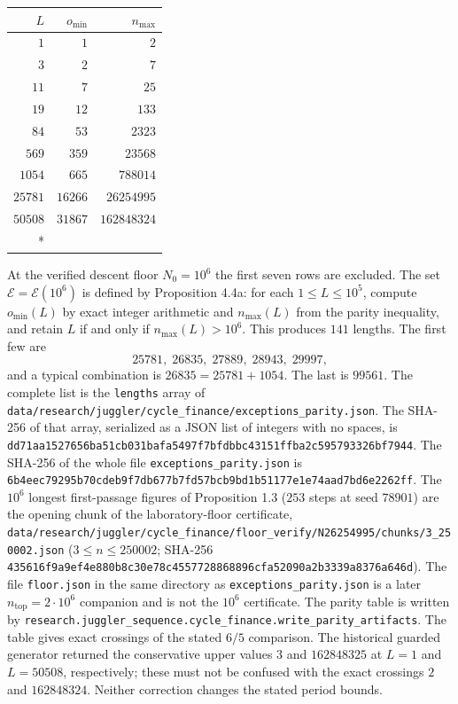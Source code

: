 \documentclass[12pt]{article}
\begin{document}
\begingroup\small

\begin{longtable}[]{@{}rrr@{}}
\toprule\noalign{}
\(L\) & \(o_{\min}\) & \(n_{\max}\) \\
\midrule\noalign{}
\endhead
\bottomrule\noalign{}
\endfoot
\bottomrule\noalign{}
\endlastfoot
\(1\) & \(1\) & \(2\) \\
\(3\) & \(2\) & \(7\) \\
\(11\) & \(7\) & \(25\) \\
\(19\) & \(12\) & \(133\) \\
\(84\) & \(53\) & \(2323\) \\
\(569\) & \(359\) & \(23568\) \\
\(1054\) & \(665\) & \(788014\) \\
\(25781\) & \(16266\) & \(26254995\) \\
\(50508\) & \(31867\) & \(162848324\) \\*
\end{longtable}

\endgroup

At the verified descent floor \(N_0=10^6\) the first seven rows are
excluded. The set \(\mathcal E=\mathcal E(10^6)\) is defined by
Proposition 4.4a: for each \(1\le L\le 10^5\), compute \(o_{\min}(L)\)
by exact integer arithmetic and \(n_{\max}(L)\) from the parity
inequality, and retain \(L\) if and only if \(n_{\max}(L)>10^6\). This
produces \(141\) lengths. The first few are \[
25781,\;26835,\;27889,\;28943,\;29997,
\] and a typical combination is \(26835=25781+1054\). The last is
\(99561\). The complete list is the \texttt{\nolinkurl{lengths}} array
of
\texttt{\nolinkurl{data/research/juggler/cycle_finance/exceptions_parity.json}}.
The SHA-256 of that array, serialized as a JSON list of integers with no
spaces, is
\texttt{\nolinkurl{dd71aa1527656ba51cb031bafa5497f7bfdbbc43151ffba2c595793326bf7944}}.
The SHA-256 of the whole file
\texttt{\nolinkurl{exceptions_parity.json}} is
\texttt{\nolinkurl{6b4eec79295b70cdeb9f7db677b7fd57bcb9bd1b51177e1e74aad7bd6e2262ff}}.
The \(10^6\) longest first-passage figures of Proposition 1.3 (\(253\)
steps at seed \(78901\)) are the opening chunk of the laboratory-floor
certificate,
\texttt{\nolinkurl{data/research/juggler/cycle_finance/floor_verify/N26254995/chunks/3_250002.json}}
(\(3\le n\le 250002\); SHA-256
\texttt{\nolinkurl{435616f9a9ef4e880b8c30e78c4557728868896cfa52090a2b3339a8376a646d}}).
The file \texttt{\nolinkurl{floor.json}} in the same directory as
\texttt{\nolinkurl{exceptions_parity.json}} is a later
\(n_{\mathrm{top}}=2\cdot10^6\) companion and is not the \(10^6\)
certificate. The parity table is written by
\texttt{\nolinkurl{research.juggler_sequence.cycle_finance.write_parity_artifacts}}.
The table gives exact crossings of the stated \(6/5\) comparison. The
historical guarded generator returned the conservative upper values
\(3\) and \(162848325\) at \(L=1\) and \(L=50508\), respectively; these
must not be confused with the exact crossings \(2\) and \(162848324\).
Neither correction changes the stated period bounds.
\end{document}
